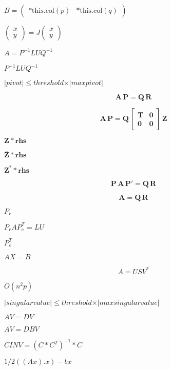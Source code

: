 \documentclass{article}
\begin{document}
$ B = \left ( \begin{array}{cc} \text{*this.col}(p) & \text{*this.col}(q) \end{array} \right ) $
\pagebreak

$ \left ( \begin{array}{cc} x \\ y \end{array} \right ) = J \left ( \begin{array}{cc} x \\ y \end{array} \right ) $
\pagebreak

$ A = P^{-1} L U Q^{-1} $
\pagebreak

$ P^{-1} L U Q^{-1} $
\pagebreak

$ \vert pivot \vert \leqslant threshold \times \vert maxpivot \vert $
\pagebreak

\[ \mathbf{A} \, \mathbf{P} = \mathbf{Q} \, \mathbf{R} \]
\pagebreak

\[ \mathbf{A} \, \mathbf{P} = \mathbf{Q} \, \begin{bmatrix} \mathbf{T} & \mathbf{0} \\ \mathbf{0} & \mathbf{0} \end{bmatrix} \, \mathbf{Z} \]
\pagebreak

$ \mathbf{Z} * \mathbf{rhs} $
\pagebreak

$ \mathbf{\overline Z} * \mathbf{rhs} $
\pagebreak

$ \mathbf{Z}^* * \mathbf{rhs} $
\pagebreak

\[ \mathbf{P} \, \mathbf{A} \, \mathbf{P}' = \mathbf{Q} \, \mathbf{R} \]
\pagebreak

\[ \mathbf{A} = \mathbf{Q} \, \mathbf{R} \]
\pagebreak

$ P_r $
\pagebreak

$P_r A P_c^T = L U$
\pagebreak

$ P_c^T $
\pagebreak

$ A X = B $
\pagebreak

\[ A = U S V^* \]
\pagebreak

$ O(n^2p) $
\pagebreak

$ \vert singular value \vert \leqslant threshold \times \vert max singular value \vert $
\pagebreak

$ A V = D V $
\pagebreak

$ A V = D B V $
\pagebreak

$ CINV = (C * C^T)^{-1} * C $
\pagebreak

$ 1/2((Ax).x) - bx $
\pagebreak
\end{document}
